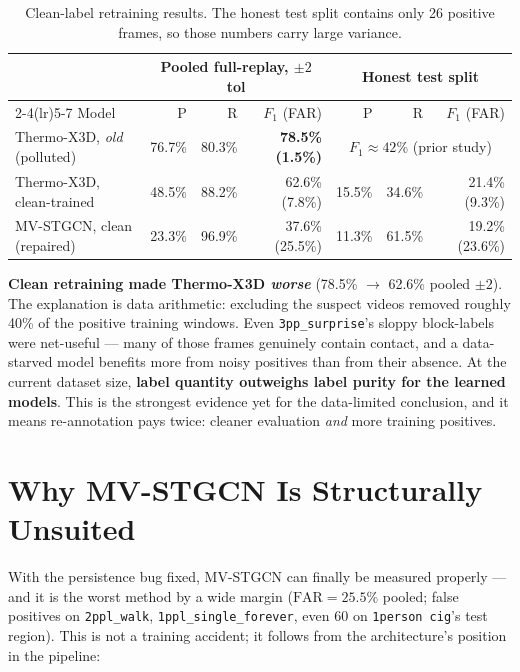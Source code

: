 \documentclass[11pt, a4paper]{article}
\begin{document}
\begin{table}[H]
\centering
\small
\setlength{\tabcolsep}{4pt}%
\begin{tabular}{lrrrrrr}
\toprule
 & \multicolumn{3}{c}{Pooled full-replay, $\pm2$ tol} & \multicolumn{3}{c}{Honest test split} \\
\cmidrule(lr){2-4}\cmidrule(lr){5-7}
Model & P & R & $F_1$ (FAR) & P & R & $F_1$ (FAR) \\
\midrule
Thermo-X3D, \emph{old} (polluted)  & 76.7\% & 80.3\% & \textbf{78.5\% (1.5\%)} & \multicolumn{3}{c}{$F_1\approx42\%$ (prior study)} \\
Thermo-X3D, clean-trained          & 48.5\% & 88.2\% & 62.6\% (7.8\%) & 15.5\% & 34.6\% & 21.4\% (9.3\%) \\
MV-STGCN, clean (repaired)         & 23.3\% & 96.9\% & 37.6\% (25.5\%) & 11.3\% & 61.5\% & 19.2\% (23.6\%) \\
\bottomrule
\end{tabular}
\caption{Clean-label retraining results. The honest test split contains only 26
positive frames, so those numbers carry large variance.}
\end{table}

\textbf{Clean retraining made Thermo-X3D \emph{worse}} (78.5\% $\rightarrow$ 62.6\%
pooled $\pm2$). The explanation is data arithmetic: excluding the suspect videos removed
roughly 40\% of the positive training windows. Even \texttt{3pp\_surprise}'s sloppy
block-labels were net-useful --- many of those frames genuinely contain contact, and a
data-starved model benefits more from noisy positives than from their absence. At the
current dataset size, \textbf{label quantity outweighs label purity for the learned
models}. This is the strongest evidence yet for the data-limited conclusion, and it means
re-annotation pays twice: cleaner evaluation \emph{and} more training positives.

\section{Why MV-STGCN Is Structurally Unsuited}
\label{sec:stgcn}

With the persistence bug fixed, MV-STGCN can finally be measured properly --- and it is
the worst method by a wide margin ($\mathrm{FAR}=25.5\%$ pooled; false positives on
\texttt{2ppl\_walk}, \texttt{1ppl\_single\_forever}, even 60 on \texttt{1person\,cig}'s
test region). This is not a training accident; it follows from the architecture's
position in the pipeline:
\end{document}
